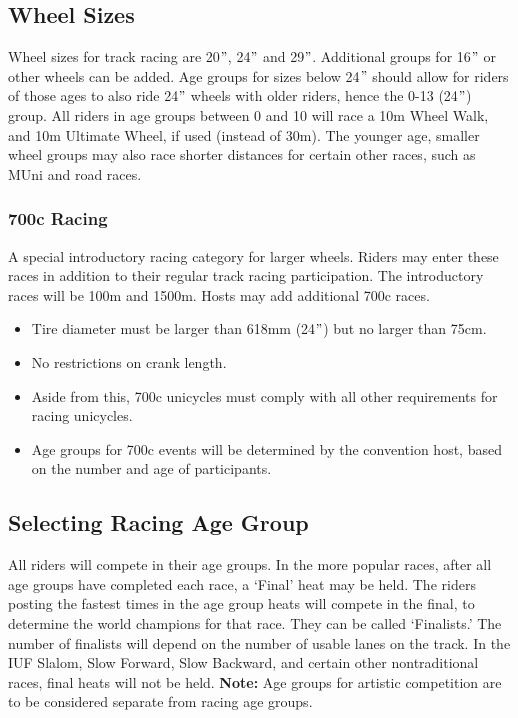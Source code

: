 \subsection{Wheel Sizes}
Wheel sizes for track racing are 20$"$, 24$"$ and 29$"$.
Additional groups for 16$"$ or other wheels can be added.
Age groups for sizes below 24$"$ should allow for riders of those ages to also ride 24$"$ wheels with older riders, hence the 0-13 (24$"$) group.
All riders in age groups between 0 and 10 will race a 10m Wheel Walk, and 10m Ultimate Wheel, if used (instead of 30m).
The younger age, smaller wheel groups may also race shorter distances for certain other races, such as MUni and road races.

\subsubsection{700c Racing}
A special introductory racing category for larger wheels.
Riders may enter these races in addition to their regular track racing participation.
The introductory races will be 100m and 1500m.
Hosts may add additional 700c races.
\begin{itemize}
\item Tire diameter must be larger than 618mm (24$"$) but no larger than 75cm.
\item No restrictions on crank length.
\item Aside from this, 700c unicycles must comply with all other requirements for racing unicycles.
\item Age groups for 700c events will be determined by the convention host, based on the number and age of participants.
\end{itemize}

\subsection{Selecting Racing Age Group}
All riders will compete in their age groups.
In the more popular races, after all age groups have completed each race, a ‘Final' heat may be held.
The riders posting the fastest times in the age group heats will compete in the final, to determine the world champions for that race.
They can be called ‘Finalists.' The number of finalists will depend on the number of usable lanes on the track.
In the IUF Slalom, Slow Forward, Slow Backward, and certain other nontraditional races, final heats will not be held.
\textbf{Note:} Age groups for artistic competition are to be considered separate from racing age groups.

